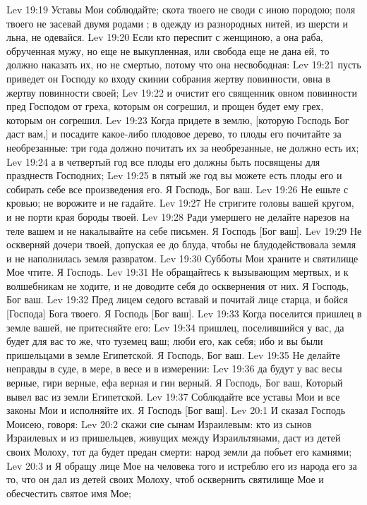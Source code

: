 \vs Lev 19:19 Уставы Мои соблюдайте; скота твоего не своди с иною породою; поля твоего не засевай двумя родами ; в одежду из разнородных нитей, из шерсти и льна, не одевайся.
\vs Lev 19:20 Если кто переспит с женщиною, а она раба, обрученная мужу, но еще не выкупленная, или свобода еще не дана ей, то должно наказать их, но не смертью, потому что она несвободная:
\vs Lev 19:21 пусть приведет он Господу ко входу скинии собрания жертву повинности, овна в жертву повинности своей;
\vs Lev 19:22 и очистит его священник овном повинности пред Господом от греха, которым он согрешил, и прощен будет ему грех, которым он согрешил.
\vs Lev 19:23 Когда придете в землю, [которую Господь Бог даст вам,] и посадите какое-либо плодовое дерево, то плоды его почитайте за необрезанные: три года должно почитать их за необрезанные, не должно есть их;
\vs Lev 19:24 а в четвертый год все плоды его должны быть посвящены для празднеств Господних;
\vs Lev 19:25 в пятый же год вы можете есть плоды его и собирать себе все произведения его. Я Господь, Бог ваш.
\vs Lev 19:26 Не ешьте с кровью; не ворожите и не гадайте.
\vs Lev 19:27 Не стригите головы вашей кругом, и не порти края бороды твоей.
\vs Lev 19:28 Ради умершего не делайте нарезов на теле вашем и не накалывайте на себе письмен. Я Господь [Бог ваш].
\vs Lev 19:29 Не оскверняй дочери твоей, допуская ее до блуда, чтобы не блудодействовала земля и не наполнилась земля развратом.
\vs Lev 19:30 Субботы Мои храните и святилище Мое чтите. Я Господь.
\vs Lev 19:31 Не обращайтесь к вызывающим мертвых, и к волшебникам не ходите, и не доводите себя до осквернения от них. Я Господь, Бог ваш.
\vs Lev 19:32 Пред лицем седого вставай и почитай лице старца, и бойся [Господа] Бога твоего. Я Господь [Бог ваш].
\vs Lev 19:33 Когда поселится пришлец в земле вашей, не притесняйте его:
\vs Lev 19:34 пришлец, поселившийся у вас, да будет для вас то же, что туземец ваш; люби его, как себя; ибо и вы были пришельцами в земле Египетской. Я Господь, Бог ваш.
\vs Lev 19:35 Не делайте неправды в суде, в мере, в весе и в измерении:
\vs Lev 19:36 да будут у вас весы верные, гири верные, ефа верная и гин верный. Я Господь, Бог ваш, Который вывел вас из земли Египетской.
\vs Lev 19:37 Соблюдайте все уставы Мои и все законы Мои и исполняйте их. Я Господь [Бог ваш].
\vs Lev 20:1 И сказал Господь Моисею, говоря:
\vs Lev 20:2 скажи сие сынам Израилевым: кто из сынов Израилевых и из пришельцев, живущих между Израильтянами, даст из детей своих Молоху, тот да будет предан смерти: народ земли да побьет его камнями;
\vs Lev 20:3 и Я обращу лице Мое на человека того и истреблю его из народа его за то, что он дал из детей своих Молоху, чтоб осквернить святилище Мое и обесчестить святое имя Мое;
